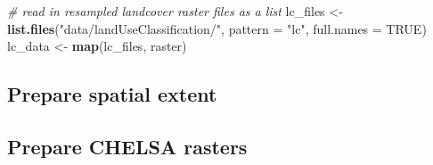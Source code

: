 \documentclass[]{article}
\newenvironment{Shaded}{}{}
\newcommand{\CommentTok}[1]{\textcolor[rgb]{0.38,0.63,0.69}{\textit{#1}}}
\newcommand{\DataTypeTok}[1]{\textcolor[rgb]{0.56,0.13,0.00}{#1}}
\newcommand{\DecValTok}[1]{\textcolor[rgb]{0.25,0.63,0.44}{#1}}
\newcommand{\FloatTok}[1]{\textcolor[rgb]{0.25,0.63,0.44}{#1}}
\newcommand{\KeywordTok}[1]{\textcolor[rgb]{0.00,0.44,0.13}{\textbf{#1}}}
\newcommand{\NormalTok}[1]{#1}
\newcommand{\OperatorTok}[1]{\textcolor[rgb]{0.40,0.40,0.40}{#1}}
\newcommand{\OtherTok}[1]{\textcolor[rgb]{0.00,0.44,0.13}{#1}}
\newcommand{\StringTok}[1]{\textcolor[rgb]{0.25,0.44,0.63}{#1}}
\begin{document}
\begin{Shaded}
\begin{Highlighting}[]
\CommentTok{# read in resampled landcover raster files as a list}
\NormalTok{lc_files <-}\StringTok{ }\KeywordTok{list.files}\NormalTok{(}\StringTok{"data/landUseClassification/"}\NormalTok{, }\DataTypeTok{pattern =} \StringTok{"lc"}\NormalTok{, }\DataTypeTok{full.names =} \OtherTok{TRUE}\NormalTok{)}
\NormalTok{lc_data <-}\StringTok{ }\KeywordTok{map}\NormalTok{(lc_files, raster)}
\end{Highlighting}
\end{Shaded}

\hypertarget{prepare-spatial-extent}{%
\subsection{Prepare spatial extent}\label{prepare-spatial-extent}}

\begin{Shaded}
\end{Shaded}

\hypertarget{prepare-chelsa-rasters}{%
\subsection{Prepare CHELSA rasters}\label{prepare-chelsa-rasters}}
\end{document}

